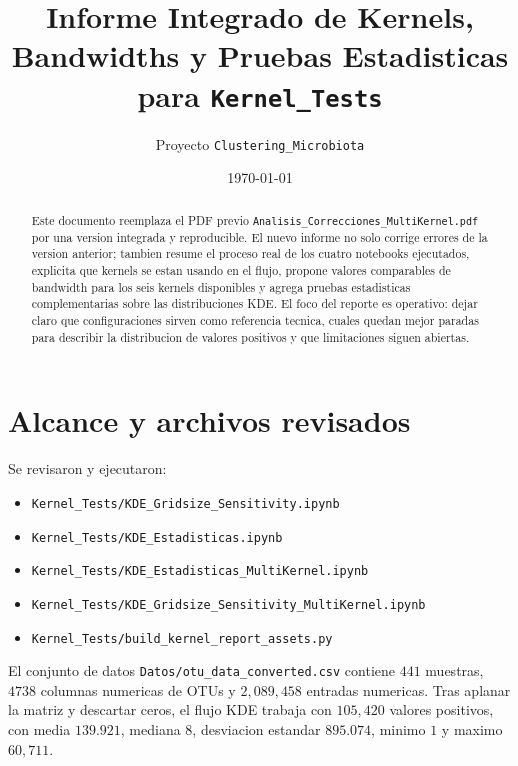 \documentclass[11pt,a4paper]{article}
\title{Informe Integrado de Kernels, Bandwidths y Pruebas Estadisticas\\para \texttt{Kernel\_Tests}}
\author{Proyecto \texttt{Clustering\_Microbiota}}
\date{\today}
\begin{document}
\maketitle

\begin{abstract}
Este documento reemplaza el PDF previo \texttt{Analisis\_Correcciones\_MultiKernel.pdf} por una
version integrada y reproducible. El nuevo informe no solo corrige errores de la version anterior;
tambien resume el proceso real de los cuatro notebooks ejecutados, explicita que kernels se estan
usando en el flujo, propone valores comparables de bandwidth para los seis kernels disponibles y
agrega pruebas estadisticas complementarias sobre las distribuciones KDE. El foco del reporte es
operativo: dejar claro que configuraciones sirven como referencia tecnica, cuales quedan mejor
paradas para describir la distribucion de valores positivos y que limitaciones siguen abiertas.
\end{abstract}

\section{Alcance y archivos revisados}
Se revisaron y ejecutaron:
\begin{itemize}[leftmargin=1.5em]
\item \texttt{Kernel\_Tests/KDE\_Gridsize\_Sensitivity.ipynb}
\item \texttt{Kernel\_Tests/KDE\_Estadisticas.ipynb}
\item \texttt{Kernel\_Tests/KDE\_Estadisticas\_MultiKernel.ipynb}
\item \texttt{Kernel\_Tests/KDE\_Gridsize\_Sensitivity\_MultiKernel.ipynb}
\item \texttt{Kernel\_Tests/build\_kernel\_report\_assets.py}
\end{itemize}

El conjunto de datos \texttt{Datos/otu\_data\_converted.csv} contiene \(441\) muestras,
\(4738\) columnas numericas de OTUs y \(2{,}089{,}458\) entradas numericas. Tras aplanar la matriz
y descartar ceros, el flujo KDE trabaja con \(105{,}420\) valores positivos, con media
\(139.921\), mediana \(8\), desviacion estandar \(895.074\), minimo \(1\) y maximo \(60{,}711\).
\end{document}
